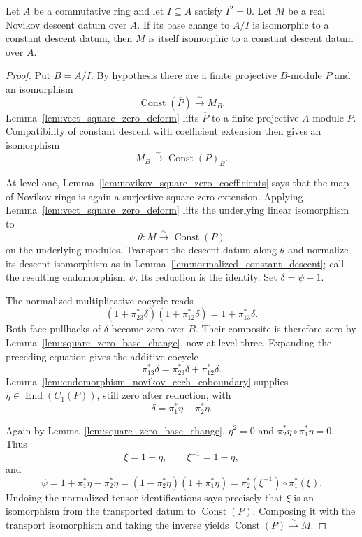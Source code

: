 \begin{lemma}
  \label{lem:novikov_descent_square_zero}
  \leanok
  Let $A$ be a commutative ring and let $I\subseteq A$ satisfy $I^2=0$.
  Let $M$ be a real Novikov descent datum over $A$.  If its base change to
  $A/I$ is isomorphic to a constant descent datum, then $M$ is itself
  isomorphic to a constant descent datum over $A$.
\end{lemma}

\begin{proof}
  \leanok
  Put $B=A/I$.  By hypothesis there are a finite projective $B$-module
  $\overline P$ and an isomorphism
  \[
    \operatorname{Const}(\overline P)\xrightarrow{\sim}M_B.
  \]
  Lemma~\ref{lem:vect_square_zero_deform} lifts $\overline P$ to a finite
  projective $A$-module $P$.  Compatibility of constant descent with
  coefficient extension then gives an isomorphism
  \[
    M_B\xrightarrow{\sim}\operatorname{Const}(P)_B.
  \]

  At level one, Lemma~\ref{lem:novikov_square_zero_coefficients} says that the
  map of Novikov rings is again a surjective square-zero extension.  Applying
  Lemma~\ref{lem:vect_square_zero_deform} lifts the underlying linear
  isomorphism to
  \[
    \theta\colon M\xrightarrow{\sim}\operatorname{Const}(P)
  \]
  on the underlying modules.  Transport the descent datum along $\theta$ and
  normalize its descent isomorphism as in
  Lemma~\ref{lem:normalized_constant_descent}; call the resulting
  endomorphism $\psi$.  Its reduction is the identity.  Set
  $\delta=\psi-1$.

  The normalized multiplicative cocycle reads
  \[
    (1+\pi_{23}^\ast\delta)(1+\pi_{12}^\ast\delta)
      =1+\pi_{13}^\ast\delta.
  \]
  Both face pullbacks of $\delta$ become zero over $B$.  Their composite is
  therefore zero by Lemma~\ref{lem:square_zero_base_change}, now at level
  three.  Expanding the preceding equation gives the additive cocycle
  \[
    \pi_{13}^\ast\delta
      =\pi_{23}^\ast\delta+\pi_{12}^\ast\delta.
  \]
  Lemma~\ref{lem:endomorphism_novikov_cech_coboundary} supplies
  $\eta\in\operatorname{End}(C_1(P))$, still zero after reduction, with
  \[
    \delta=\pi_1^\ast\eta-\pi_2^\ast\eta.
  \]

  Again by Lemma~\ref{lem:square_zero_base_change}, $\eta^2=0$ and
  $\pi_2^\ast\eta\circ\pi_1^\ast\eta=0$.  Thus
  \[
    \xi=1+\eta,
    \qquad
    \xi^{-1}=1-\eta,
  \]
  and
  \[
    \psi
      =1+\pi_1^\ast\eta-\pi_2^\ast\eta
      =(1-\pi_2^\ast\eta)(1+\pi_1^\ast\eta)
      =\pi_2^\ast(\xi^{-1})\circ\pi_1^\ast(\xi).
  \]
  Undoing the normalized tensor identifications says precisely that $\xi$ is
  an isomorphism from the transported datum to $\operatorname{Const}(P)$.
  Composing it with the transport isomorphism and taking the inverse yields
  $\operatorname{Const}(P)\xrightarrow{\sim}M$.
\end{proof}
